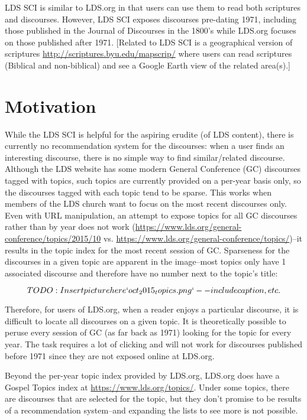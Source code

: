 LDS SCI is similar to LDS.org in that users can use them to read both scriptures and discourses. However, LDS SCI exposes discourses pre-dating 1971, including those published in the Journal of Discourses in the 1800’s while LDS.org focuses on those published after 1971. [Related to LDS SCI is a geographical version of scriptures \url{http://scriptures.byu.edu/mapscrip/} where users can read scriptures (Biblical and non-biblical) and see a Google Earth view of the related area(s).]

\section{Motivation}
While the LDS SCI is helpful for the aspiring erudite (of LDS content), there is currently no recommendation system for the discourses: when a user finds an interesting discourse, there is no simple way to find similar/related discourse. Although the LDS website has some modern General Conference (GC) discourses tagged with topics, such topics are currently provided on a per-year basis only, so the discourses tagged with each topic tend to be sparse. This works when members of the LDS church want to focus on the most recent discourses only. Even with URL manipulation, an attempt to expose topics for all GC discourses rather than by year does not work (\url{https://www.lds.org/general-conference/topics/2015/10} vs. \url{https://www.lds.org/general-conference/topics/})--it results in the topic index for the most recent session of GC. Sparseness for the discourses in a given topic are apparent in the image--most topics only have 1 associated discourse and therefore have no number next to the topic’s title:

\[TODO: Insert picture here `oct_2015_topics.png`--include caption, etc.\]

Therefore, for users of LDS.org, when a reader enjoys a particular discourse, it is difficult to locate all discourses on a given topic. It is theoretically possible to peruse every session of GC (as far back as 1971) looking for the topic for every year. The task requires a lot of clicking and will not work for discourses published before 1971 since they are not exposed online at LDS.org.

Beyond the per-year topic index provided by LDS.org, LDS.org does have a Gospel Topics index at \url{https://www.lds.org/topics/}. Under some topics, there are discourses that are selected for the topic, but they don’t promise to be results of a recommendation system--and expanding the lists to see more is not possible.


